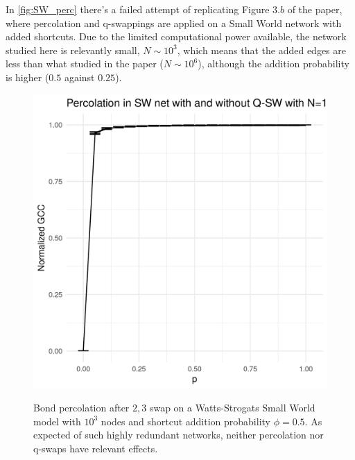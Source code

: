 In \autoref{fig:SW_perc} there's a failed attempt of replicating Figure $3.b$ of the paper, where percolation and q-swappings are applied on a Small World network with added shortcuts. Due to the limited computational power available, the network studied here is relevantly small, $N\sim 10^3$, which means that the added edges are less than what studied in the paper ($N\sim 10^6$), although the addition probability is higher ($0.5$ against $0.25$).
\begin{figure}
    \centering
    \includegraphics[width=0.45\linewidth]{images/SW_perc_1000.png}
    \label{fig:SW_perc}
    \caption{Bond percolation after $2,3$ swap on a Watts-Strogats Small World model with $10^3$ nodes and shortcut addition probability $\phi=0.5$. As expected of such highly redundant networks, neither percolation nor q-swaps have relevant effects.}
\end{figure}

\newpage